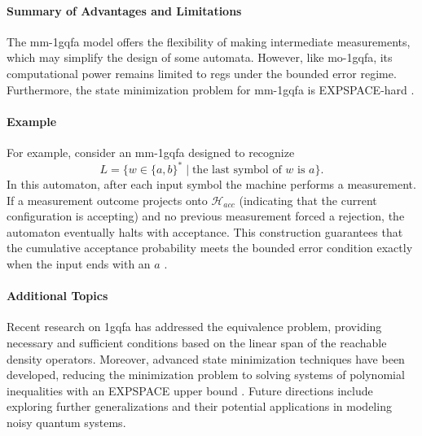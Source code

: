 \paragraph{Summary of Advantages and Limitations} 
The \gls{mm-1gqfa} model offers the flexibility of making intermediate measurements, which may simplify the design of some automata. However, like \gls{mo-1gqfa}, its computational power remains limited to \glspl{reg} under the bounded error regime. Furthermore, the state minimization problem for \gls{mm-1gqfa} is EXPSPACE‐hard \cite{mateus2012complexity}.

\paragraph{Example}  
For example, consider an \gls{mm-1gqfa} designed to recognize 
\[
L=\{w\in\{a,b\}^* \mid \text{the last symbol of }w\text{ is }a\}.
\]
In this automaton, after each input symbol the machine performs a measurement. If a measurement outcome projects onto $\mathcal{H}_{acc}$ (indicating that the current configuration is accepting) and no previous measurement forced a rejection, the automaton eventually halts with acceptance. This construction guarantees that the cumulative acceptance probability meets the bounded error condition exactly when the input ends with an $a$ \cite{li2012characterizations}.

\paragraph{Additional Topics}  
Recent research on \gls{1gqfa} has addressed the equivalence problem, providing necessary and sufficient conditions based on the linear span of the reachable density operators. Moreover, advanced state minimization techniques have been developed, reducing the minimization problem to solving systems of polynomial inequalities with an EXPSPACE upper bound \cite{mercer2008lower}. Future directions include exploring further generalizations and their potential applications in modeling noisy quantum systems.


